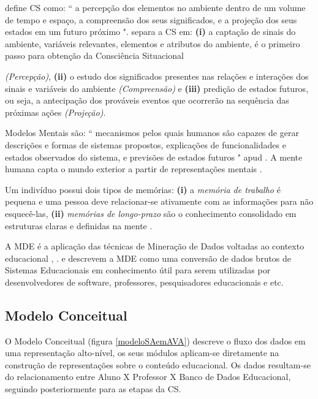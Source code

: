 \documentclass[
	oneside,
	12pt,				%
	a4paper,			%
	english,			%
	brazil,				%
	article
	]{abntex2}
\begin{document}
\cite [p. 97]{Endsley1988} define CS como: `` a percepção dos elementos no ambiente dentro de um volume de tempo e espaço, a compreensão dos seus significados, e a projeção dos seus estados em um futuro próximo ".  separa  a CS em: \textbf{(i)} a captação de sinais do ambiente, variáveis relevantes, elementos e atributos do ambiente, é o primeiro passo para obtenção da Consciência Situacional {\textit{(Percepção)}, \textbf{(ii)} o estudo dos significados presentes nas relações e interações dos sinais e variáveis do ambiente \textit{(Compreensão)} e \textbf{(iii)} predição de estados futuros, ou seja, a antecipação dos prováveis eventos que ocorrerão na sequência das próximas ações \textit{(Projeção)}.  

Modelos Mentais são: `` mecanismos pelos quais humanos são capazes de gerar descrições e formas de sistemas propostos, explicações de funcionalidades e estados observados do sistema, e previsões de estados futuros " \cite[p.60]{Rouse1985} apud \cite{Endsley1995}. A mente humana capta o mundo exterior a partir de representações mentais \cite{Moreira1996}. 

Um indivíduo  possui dois tipos de memórias: \textbf{(i)} a \textit{memória de trabalho} é pequena e uma pessoa deve relacionar-se ativamente com as informações para não esquecê-las, \textbf{(ii)} \textit{memórias de longo-prazo} são o conhecimento consolidado em estruturas claras e definidas na mente \cite{Endsley2012}.

A MDE é a aplicação das técnicas de Mineração de Dados voltadas ao contexto educacional \cite{Leite_et_al_2016},  \cite{Romero_Ventura_2013}.  e  descrevem a MDE como uma conversão de dados brutos de Sistemas Educacionais em conhecimento útil para serem utilizadas por desenvolvedores de software, professores, pesquisadores educacionais e etc.

\subsection{Modelo Conceitual}

O Modelo Conceitual (figura \ref{modeloSAemAVA}) descreve o fluxo dos dados em uma representação alto-nível, os seus módulos aplicam-se diretamente na construção de representações sobre o conteúdo educacional. Os dados resultam-se do relacionamento entre Aluno X Professor X Banco de Dados Educacional, seguindo posteriormente para as etapas da CS.

}
\end{document}
